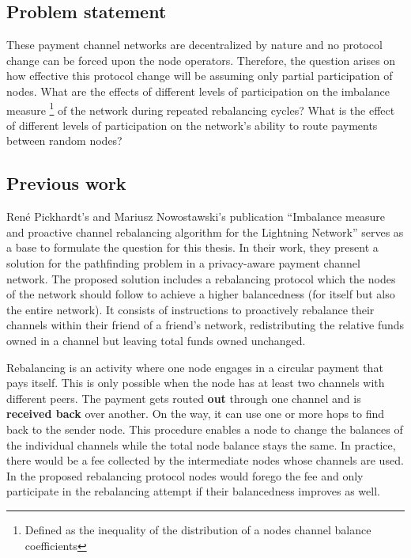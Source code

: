 \documentclass[final]{fhnwreport}       %
\begin{document}
\subsection{Problem statement}

These payment channel networks are decentralized by nature and no protocol change can be forced upon the node operators. Therefore, the question arises on how effective this protocol change will be assuming only partial participation of nodes. What are the effects of different levels of participation on the imbalance measure \footnote{Defined as the inequality of the distribution of a nodes channel balance coefficients} of the network during repeated rebalancing cycles? What is the effect of different levels of participation on the network's ability to route payments between random nodes? 

\subsection{Previous work}
René Pickhardt's and Mariusz Nowostawski's publication ``Imbalance measure and proactive channel rebalancing algorithm for the Lightning Network'' \cite{pickhardt_imbalance_2019} serves as a base to formulate the question for this thesis. In their work, they present a solution for the pathfinding problem in a privacy-aware payment channel network. The proposed solution includes a rebalancing protocol which the nodes of the network should follow to achieve a higher balancedness (for itself but also the entire network). It consists of instructions to proactively rebalance their channels within their friend of a friend's network, redistributing the relative funds owned in a channel but leaving total funds owned unchanged.

Rebalancing is an activity where one node engages in a circular payment that pays itself. This is only possible when the node has at least two channels with different peers. The payment gets routed \textbf{out} through one channel and is \textbf{received back} over another. On the way, it can use one or more hops to find back to the sender node. This procedure enables a node to change the balances of the individual channels while the total node balance stays the same. In practice, there would be a fee collected by the intermediate nodes whose channels are used. In the proposed rebalancing protocol nodes would forego the fee and only participate in the rebalancing attempt if their balancedness improves as well.
\end{document}
